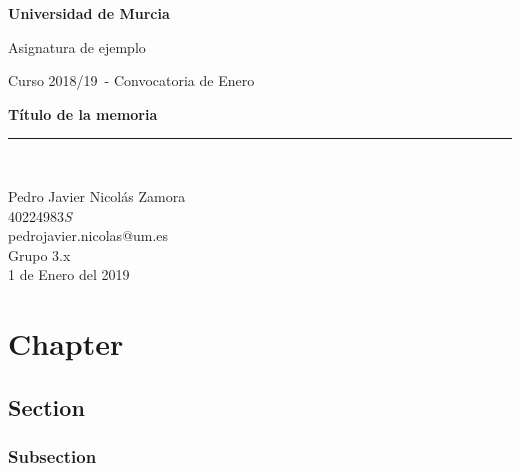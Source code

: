 \documentclass[a4paper,spanish,12pt]{report}
\title{\textitle}
\author{\texauthor}
\date{\texdate}
\makeatletter
\newcommand{\textitle}{Título de la memoria}
\newcommand{\texsubject}{Asignatura de ejemplo}
\newcommand{\texyear}{2018/19}
\newcommand{\texmonth}{Enero}
\newcommand{\texdate}{1 de Enero del 2019}
\newcommand{\texgroup}{Grupo 3.x}
\newcommand{\texauthor}{Pedro Javier Nicol\'as Zamora}
\newcommand{\texemail}{pedrojavier.nicolas@um.es}
\newcommand{\texnif}{40224983\textit{S}}
\makeatother
\begin{document}
\begin{titlepage}
\begin{center}
\begin{Huge}
\textbf{Universidad de Murcia}\\
\end{Huge}
\begin{huge}
\vspace{0.1cm}
\texsubject \\
\end{huge}
\begin{LARGE}
Curso \texyear\ - Convocatoria de \texmonth \\
\end{LARGE}
\vspace*{2cm}
\begin{Huge}
\textbf{\textitle} \\
\end{Huge}
\vspace*{\fill}
\rule{80mm}{0.1mm}\\
\vspace*{0.5cm}
\begin{Large}

\texauthor\\
\texnif\\
\texemail\\

\vspace*{0.5cm}
\texgroup \\
\texdate \\
\end{Large}
\end{center}
\end{titlepage}

\setcounter{page}{2}

\tableofcontents
\pagebreak




\chapter{Chapter}
\section{Section}
\subsection{Subsection}
\end{document}
